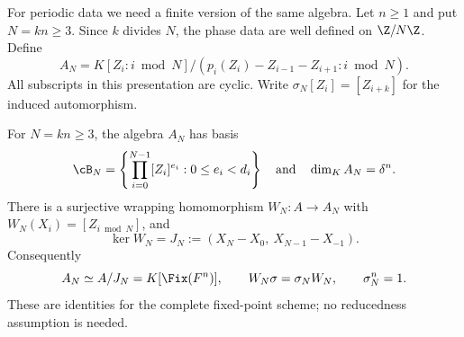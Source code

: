 For periodic data we need a finite version of the same algebra.  Let
$n\ge1$ and put $N=kn\ge3$.  Since $k$ divides $N$, the phase data
are well defined on $\Z/N\Z$.  Define
\begin{equation}
  A_N=K[Z_i:i\bmod N]\big/
  (p_i(Z_i)-Z_{i-1}-Z_{i+1}:i\bmod N).
  \label{eq:finite-orbit-algebra}
\end{equation}
All subscripts in this presentation are cyclic.  Write
$\sigma_N[Z_i]=[Z_{i+k}]$ for the induced automorphism.

\begin{proposition}
\label{prop:periodic-algebra}
For $N=kn\ge3$, the algebra $A_N$ has basis
\begin{equation}
  \cB_N=
  \left\{\prod_{i=0}^{N-1}[Z_i]^{e_i}:0\le e_i<d_i\right\}
  \quad\text{and}\quad
  \dim_K A_N=\delta^n.
  \label{eq:finite-basis-length}
\end{equation}
There is a surjective wrapping homomorphism $W_N:A\to A_N$ with
$W_N(X_i)=[Z_{i\bmod N}]$, and
\begin{equation}
  \ker W_N=J_N:=(X_N-X_0,\ X_{N-1}-X_{-1}).
  \label{eq:fixed-scheme-ideal}
\end{equation}
Consequently
\begin{equation}
  A_N\simeq A/J_N=K[\Fix(F^n)],\qquad
  W_N\sigma=\sigma_NW_N,\qquad \sigma_N^n=1.
  \label{eq:fixed-scheme-identification}
\end{equation}
These are identities for the complete fixed-point scheme; no reducedness
assumption is needed.
\end{proposition}

